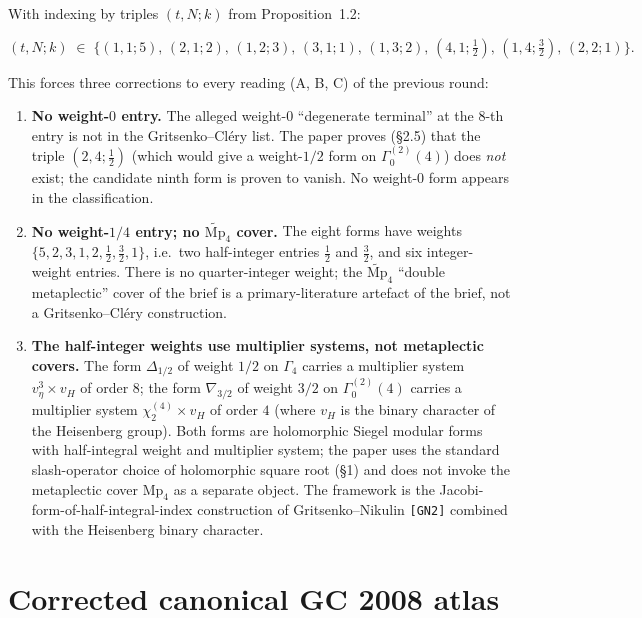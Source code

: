With indexing by triples $(t, N; k)$ from Proposition~1.2:

\[
(t, N; k) \;\in\; \bigl\{
  (1, 1; 5),\, (2, 1; 2),\, (1, 2; 3),\, (3, 1; 1),\, (1, 3; 2),\,
  (4, 1; \tfrac{1}{2}),\, (1, 4; \tfrac{3}{2}),\, (2, 2; 1)
\bigr\}.
\]

This forces three corrections to every reading (A, B, C) of the previous
round:

\begin{enumerate}
\item \textbf{No weight-$0$ entry.} The alleged weight-$0$ ``degenerate
terminal'' at the $8$-th entry is not in the Gritsenko--Cl\'ery list.
The paper proves (\S 2.5) that the triple $(2, 4; \tfrac{1}{2})$
(which would give a weight-$1/2$ form on $\Gamma_0^{(2)}(4)$) does
\emph{not} exist; the candidate ninth form is proven to vanish. No
weight-$0$ form appears in the classification.

\item \textbf{No weight-$1/4$ entry; no $\widetilde{\mathrm{Mp}}_4$
cover.} The eight forms have weights
$\{5, 2, 3, 1, 2, \tfrac{1}{2}, \tfrac{3}{2}, 1\}$, i.e.\ two
half-integer entries $\tfrac{1}{2}$ and $\tfrac{3}{2}$, and six
integer-weight entries. There is no quarter-integer weight; the
$\widetilde{\mathrm{Mp}}_4$ ``double metaplectic'' cover of the brief
is a primary-literature artefact of the brief, not a Gritsenko--Cl\'ery
construction.

\item \textbf{The half-integer weights use multiplier systems, not
metaplectic covers.} The form $\Delta_{1/2}$ of weight $1/2$ on
$\Gamma_4$ carries a multiplier system $v_\eta^3 \times v_H$ of order
$8$; the form $\nabla_{3/2}$ of weight $3/2$ on $\Gamma_0^{(2)}(4)$
carries a multiplier system $\chi_2^{(4)} \times v_H$ of order $4$
(where $v_H$ is the binary character of the Heisenberg group). Both
forms are holomorphic Siegel modular forms with half-integral weight
and multiplier system; the paper uses the standard slash-operator
choice of holomorphic square root (\S 1) and does not invoke the
metaplectic cover $\mathrm{Mp}_4$ as a separate object. The framework
is the Jacobi-form-of-half-integral-index construction of
Gritsenko--Nikulin \texttt{[GN2]} combined with the Heisenberg binary
character.
\end{enumerate}

\section*{Corrected canonical GC 2008 atlas}

